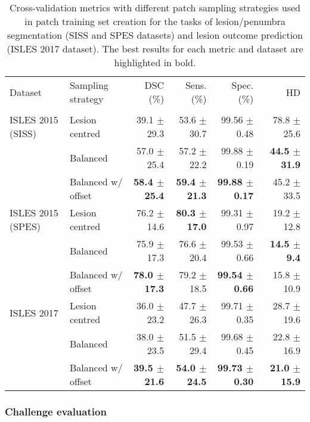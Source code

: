 \documentclass[letterpaper,final,authoryear,3p,times,twocolumn]{elsarticle}
\begin{document}
\begin{table*}
	\centering
	\caption{Cross-validation metrics with different patch sampling strategies used in patch training set creation for the tasks of lesion/penumbra segmentation (SISS and SPES datasets) and lesion outcome prediction (ISLES 2017 dataset). The best results for each metric and dataset are highlighted in bold.}
	\label{table:patchsampling}
	\begin{tabular}{llrrrr}
		Dataset & Sampling strategy & DSC (\%) & Sens. (\%) & Spec. (\%) & HD \\ [-0.6em]
		\hrulefill & \hrulefill & \hrulefill & \hrulefill & \hrulefill & \hrulefill \\ 
		ISLES 2015 (SISS) & Lesion centred & 39.1 $\pm$ 29.3 & 53.6 $\pm$ 30.7 & 99.56 $\pm$ 0.48 & 78.8 $\pm$ 25.6 \\
		& Balanced & 57.0 $\pm$ 25.4 & 57.2 $\pm$ 22.2 & 99.88 $\pm$ 0.19 & \textbf{44.5 $\pm$ 31.9} \\ 
		& Balanced w/ offset & \textbf{58.4 $\pm$ 25.4} & \textbf{59.4 $\pm$ 21.3} & \textbf{99.88 $\pm$ 0.17} & 45.2 $\pm$ 33.5 \\ [0.5em]
		ISLES 2015 (SPES) &  Lesion centred & 76.2 $\pm$ 14.6 & \textbf{80.3 $\pm$ 17.0} & 99.31 $\pm$ 0.97 & 19.2 $\pm$ 12.8 \\
		& Balanced & 75.9 $\pm$ 17.3 & 76.6 $\pm$ 20.4 & 99.53 $\pm$ 0.66 & \textbf{14.5 $\pm$ ~~9.4} \\
		& Balanced w/ offset & \textbf{78.0 $\pm$ 17.3} & 79.2 $\pm$ 18.5 & \textbf{99.54 $\pm$ 0.66} & 15.8 $\pm$ 10.9 \\  [0.5em]
		ISLES 2017 & Lesion centred & 36.0 $\pm$ 23.2 & 47.7 $\pm$ 26.3 & 99.71 $\pm$ 0.35 & 28.7 $\pm$ 19.6 \\ 
		& Balanced & 38.0 $\pm$ 23.5 & 51.5 $\pm$ 29.4 & 99.68 $\pm$ 0.45 & 22.8 $\pm$ 16.9 \\
		& Balanced w/ offset & \textbf{39.5 $\pm$ 21.6} & \textbf{54.0 $\pm$ 24.5} & \textbf{99.73 $\pm$ 0.30} & \textbf{21.0 $\pm$ 15.9} \\ 
	\end{tabular}
\end{table*}

\subsubsection{Challenge evaluation}
\end{document}
